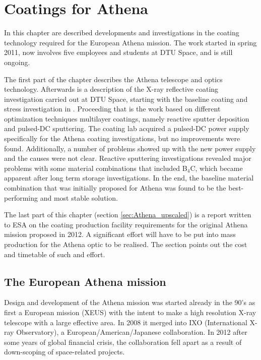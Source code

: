 \chapter{Coatings for Athena}\label{chap:Athena_coatings}
In this chapter are described developments and investigations in the coating technology required for the European Athena mission. The work started in spring 2011, now involves five employees and students at DTU Space, and is still ongoing.

The first part of the chapter describes the Athena telescope and optics technology. Afterwards is a description of the X-ray reflective coating investigation carried out at DTU Space, starting with the baseline coating and stress investigation in \cite{Jakobsen:2011vd}. Proceeding that is the work based on different optimization techniques multilayer coatings, namely reactive sputter deposition and pulsed-DC sputtering. The coating lab acquired a pulsed-DC power supply specifically for the Athena coating investigations, but no improvements were found. Additionally, a number of problems showed up with the new power supply and the causes were not clear. Reactive sputtering investigations revealed major problems with some material combinations that included B$_4$C, which became apparent after long term storage investigations. In the end, the baseline material combination that was initially proposed for Athena was found to be the best-performing and most stable solution.

The last part of this chapter (section \ref{sec:Athena_upscaled}) is a report written to ESA on the coating production facility requirements for the original Athena mission proposed in 2012. A significant effort will have to be put into mass production for the Athena optic to be realised. The section points out the cost and timetable of such and effort.

\section{The European Athena mission}
Design and development of the Athena mission was started already in the 90's as first a European mission (XEUS) with the intent to make a high resolution X-ray telescope with a large effective area. In 2008 it merged into IXO (International X-ray Observatory), a European/American/Japanese collaboration. In 2012 after some years of global financial crisis, the collaboration fell apart as a result of down-scoping of space-related projects.

